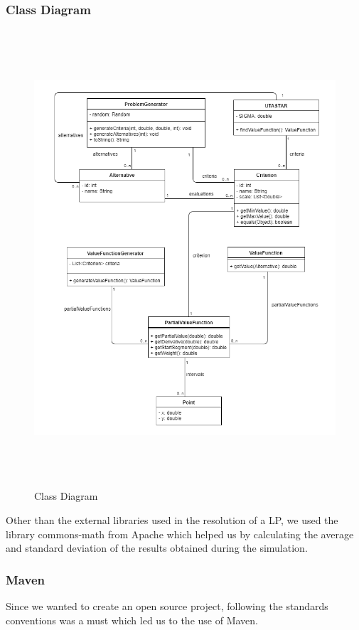 \documentclass{report}
\begin{document}
\subsubsection{Class Diagram}
\begin{figure}[H]
\centering
\includegraphics[width=17cm,height=17cm,keepaspectratio]{diagram-uml.png}
\caption{Class Diagram}
\end{figure}
Other than the external libraries used in the resolution of a LP, we used the library commons-math from Apache which helped us by calculating the average and standard deviation of the results obtained during the simulation. \\

\subsubsection{Maven}
Since we wanted to create an open source project, following the standards conventions was a must which led us to the use of Maven. \\
\end{document}
